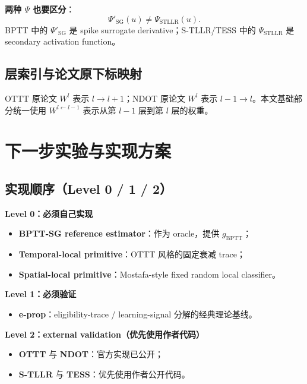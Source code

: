 \documentclass[journal,12pt,onecolumn]{IEEEtran}
\begin{document}
\textbf{两种 $\Psi$ 也要区分}：
\begin{equation}
\Psi'_{\mathrm{SG}}(u)\neq\Psi_{\mathrm{STLLR}}(u).
\end{equation}
BPTT 中的 $\Psi'_{\mathrm{SG}}$ 是 spike surrogate derivative；S-TLLR/TESS 中的 $\Psi_{\mathrm{STLLR}}$ 是 secondary activation function。

\subsection{层索引与论文原下标映射}

OTTT 原论文 $W^l$ 表示 $l\to l+1$；NDOT 原论文 $W^l$ 表示 $l-1\to l$。本文基础部分统一使用 $W^{l\leftarrow l-1}$ 表示从第 $l-1$ 层到第 $l$ 层的权重。

\section{下一步实验与实现方案}

\subsection{实现顺序（Level 0 / 1 / 2）}

\textbf{Level 0：必须自己实现}

\begin{itemize}[leftmargin=1.5em,itemsep=0pt]
\item \textbf{BPTT-SG reference estimator}：作为 oracle，提供 $g_{\mathrm{BPTT}}$；
\item \textbf{Temporal-local primitive}：OTTT 风格的固定衰减 trace；
\item \textbf{Spatial-local primitive}：Mostafa-style fixed random local classifier。
\end{itemize}

\textbf{Level 1：必须验证}

\begin{itemize}[leftmargin=1.5em,itemsep=0pt]
\item \textbf{e-prop}：eligibility-trace / learning-signal 分解的经典理论基线。
\end{itemize}

\textbf{Level 2：external validation（优先使用作者代码）}

\begin{itemize}[leftmargin=1.5em,itemsep=0pt]
\item \textbf{OTTT} 与 \textbf{NDOT}：官方实现已公开；
\item \textbf{S-TLLR} 与 \textbf{TESS}：优先使用作者公开代码。
\end{itemize}
\end{document}
